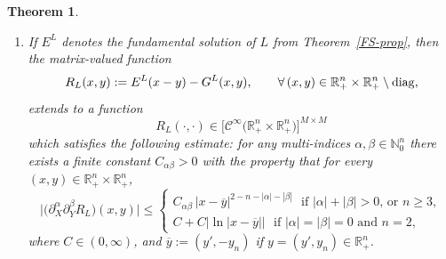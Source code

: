 \documentclass[11pt,reqno]{amsart}
\numberwithin{equation}{section}
\newtheorem{theorem}{Theorem}[section]
\theoremstyle{remark}
\begin{document}
\begin{theorem}
\begin{enumerate}
\eqref{Fvabbb-7tF}, for each fixed $x\in{\mathbb{R}}^n_{+}$ and $\varepsilon>0$, 
%
\begin{equation}\label{ghagUGDS}
G^L(x,\cdot)\in\big[{\mathscr{C}}^\infty\big(\overline{{\mathbb{R}}^n_{+}}\setminus B(x,\varepsilon)\big)\big]^{M\times M}
\,\,\text{ and }\,\,G^L(x,\cdot)\Big|_{\partial{\mathbb{R}}^n_{+}}=0
\,\,\text{ on }\,\,{\mathbb{R}}^{n-1}.
\end{equation}
%
\item[(6)] If $E^L$ denotes the fundamental solution of $L$ 
from Theorem~\ref{FS-prop}, then the matrix-valued function
%
\begin{equation}\label{defRRR}
R_L(x,y):=E^L(x-y)-G^L(x,y),\qquad\forall\,(x,y)\in{\mathbb{R}}^n_{+}\times{\mathbb{R}}^n_{+}\setminus{\rm diag},
\end{equation}
%
extends to a function 
%
\begin{equation}\label{defRRR-smooth}
R_L(\cdot,\cdot)\in\big[{\mathscr{C}}^\infty\big({\mathbb{R}}^n_{+}\times{\mathbb{R}}^n_{+}\big)\big]^{M\times M}
\end{equation}
%
which satisfies the following estimate: for any 
multi-indices $\alpha,\beta\in\mathbb{N}_0^n$ there exists a finite 
constant $C_{\alpha\beta}>0$ with the property that
for every $(x,y)\in{\mathbb{R}}^n_{+}\times{\mathbb{R}}^n_{+}$,
%
\begin{equation}\label{mainest}
\big|\big(\partial^\alpha_X\partial^\beta_Y R_L\big)(x,y)\big|\leq\left\{
\begin{array}{l}
C_{\alpha\beta}\,|x-\overline{y}|^{2-n-|\alpha|-|\beta|}\,\,
\text{ if $|\alpha|+|\beta|>0$, or $n\geq 3$},
\\[10pt]
C+C\big|\!\ln|x-\overline{y}|\big|
\,\,\text{ if $|\alpha|=|\beta|=0$ and $n=2$}, 
\end{array}
\right.
\end{equation}
%
where $C\in(0,\infty)$, and $\overline{y}:=(y',-y_n)$ if  
$y=(y',y_n)\in\mathbb{R}^n_+$.


\end{enumerate}
\end{theorem}
\end{document}
